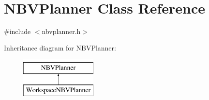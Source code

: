 \hypertarget{classNBVPlanner}{}\section{N\+B\+V\+Planner Class Reference}
\label{classNBVPlanner}


{\ttfamily \#include $<$nbvplanner.\+h$>$}

Inheritance diagram for N\+B\+V\+Planner\+:\begin{figure}[H]
\begin{center}
\leavevmode
\includegraphics[height=2.000000cm]{classNBVPlanner}
\end{center}
\end{figure}
